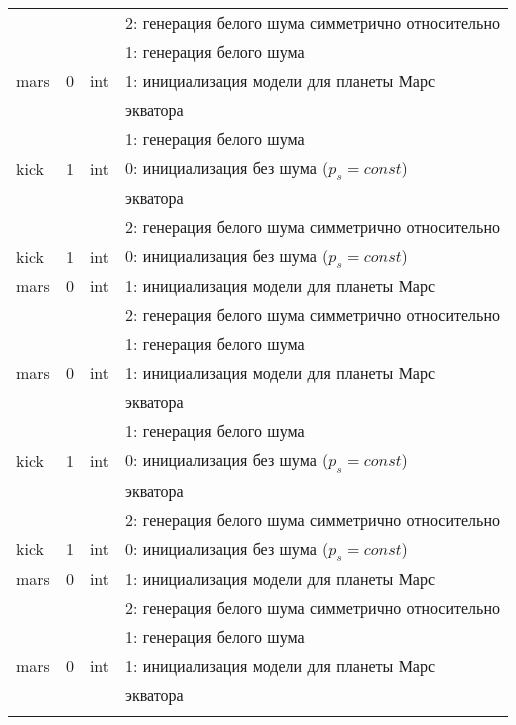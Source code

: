 \begin{longtable}[c]{|l|c|l|l|}
    &   &     & 2: генерация белого шума симметрично относительно \\
          &   &     & 1: генерация белого шума                  \\
          mars & 0 & int & 1: инициализация модели для планеты Марс     \\
      & & & экватора    \\
     &   &     & 1: генерация белого шума                  \\
    kick & 1 & int & 0: инициализация без шума (\(p_s = const\)) \\
          & & & экватора    \\
          &   &     & 2: генерация белого шума симметрично относительно \\
      kick & 1 & int & 0: инициализация без шума (\(p_s = const\)) \\
     mars & 0 & int & 1: инициализация модели для планеты Марс     \\
    &   &     & 2: генерация белого шума симметрично относительно \\
          &   &     & 1: генерация белого шума                  \\
          mars & 0 & int & 1: инициализация модели для планеты Марс     \\
      & & & экватора    \\
     &   &     & 1: генерация белого шума                  \\
    kick & 1 & int & 0: инициализация без шума (\(p_s = const\)) \\
          & & & экватора    \\
          &   &     & 2: генерация белого шума симметрично относительно \\
      kick & 1 & int & 0: инициализация без шума (\(p_s = const\)) \\
     mars & 0 & int & 1: инициализация модели для планеты Марс     \\
    &   &     & 2: генерация белого шума симметрично относительно \\
          &   &     & 1: генерация белого шума                  \\
          mars & 0 & int & 1: инициализация модели для планеты Марс     \\
      & & & экватора    \\
     \normalsize%
    \end{longtable}

\endgroup
